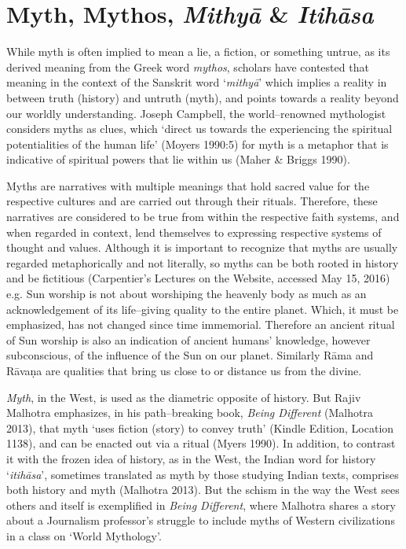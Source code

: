 \section*{Myth, Mythos, \textit{Mithyā} \& \textit{Itihāsa}}

While myth is often implied to mean a lie, a fiction, or something untrue, as its derived meaning from the Greek word \textit{mythos}, scholars have contested that meaning in the context of the Sanskrit word ‘\textit{mithyā}’ which implies a reality in between truth (history) and untruth (myth), and points towards a reality beyond our worldly understanding. Joseph Campbell, the world–renowned mythologist considers myths as clues, which ‘direct us towards the experiencing the spiritual potentialities of the human life’ (Moyers 1990:5) for myth is a metaphor that is indicative of spiritual powers that lie within us (Maher \& Briggs 1990).

Myths are narratives with multiple meanings that hold sacred value for the respective cultures and are carried out through their rituals. Therefore, these narratives are considered to be true from within the respective faith systems, and when regarded in context, lend themselves to expressing respective systems of thought and values. Although it is important to recognize that myths are usually regarded metaphorically and not literally, so myths can be both rooted in history and be fictitious (Carpentier’s Lectures on the Website, accessed May 15, 2016) e.g. Sun worship is not about worshiping the heavenly body as much as an acknowledgement of its life–giving quality to the entire planet. Which, it must be emphasized, has not changed since time immemorial. Therefore an ancient ritual of Sun worship is also an indication of ancient humans’ knowledge, however subconscious, of the influence of the Sun on our planet. Similarly Rāma and Rāvaṇa are qualities that bring us close to or distance us from the divine.

\textit{Myth}, in the West, is used as the diametric opposite of history. But Rajiv Malhotra emphasizes, in his path–breaking book, \textit{Being Different} (Malhotra 2013), that myth ‘uses fiction (story) to convey truth’ (Kindle Edition, Location 1138), and can be enacted out via a ritual (Myers 1990). In addition, to contrast it with the frozen idea of history, as in the West, the Indian word for history ‘\textit{itihāsa}’, sometimes translated as myth by those studying Indian texts, comprises both history and myth (Malhotra 2013). But the schism in the way the West sees others and itself is exemplified in \textit{Being Different}, where Malhotra shares a story about a Journalism professor’s struggle to include myths of Western civilizations in a class on ‘World Mythology’.

